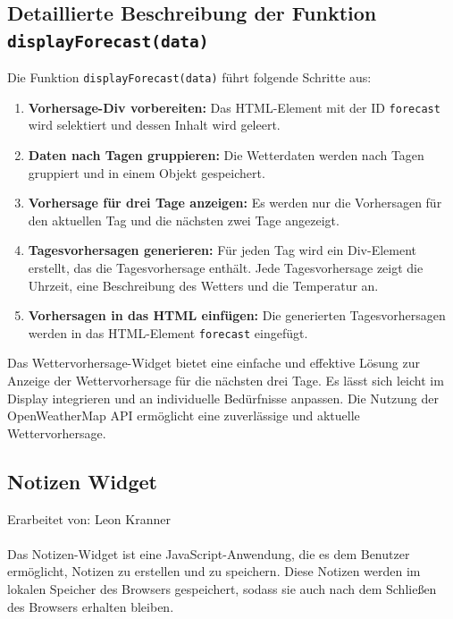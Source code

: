 \subsection*{Detaillierte Beschreibung der Funktion \texttt{displayForecast(data)}}
Die Funktion \texttt{displayForecast(data)} führt folgende Schritte aus:

\begin{enumerate}
    \item \textbf{Vorhersage-Div vorbereiten:}
    Das HTML-Element mit der ID \texttt{forecast} wird selektiert und dessen Inhalt wird geleert.
    
    \item \textbf{Daten nach Tagen gruppieren:}
    Die Wetterdaten werden nach Tagen gruppiert und in einem Objekt gespeichert.
    
    \item \textbf{Vorhersage für drei Tage anzeigen:}
    Es werden nur die Vorhersagen für den aktuellen Tag und die nächsten zwei Tage angezeigt.
    
    \item \textbf{Tagesvorhersagen generieren:}
    Für jeden Tag wird ein Div-Element erstellt, das die Tagesvorhersage enthält. Jede Tagesvorhersage zeigt die Uhrzeit, eine Beschreibung des Wetters und die Temperatur an.
    
    \item \textbf{Vorhersagen in das HTML einfügen:}
    Die generierten Tagesvorhersagen werden in das HTML-Element \texttt{forecast} eingefügt.
\end{enumerate}


\noindent
Das Wettervorhersage-Widget bietet eine einfache und effektive Lösung zur Anzeige der Wettervorhersage für die nächsten drei Tage. Es lässt sich leicht im Display integrieren und an individuelle Bedürfnisse anpassen. Die Nutzung der OpenWeatherMap API ermöglicht eine zuverlässige und aktuelle Wettervorhersage.


\subsection{Notizen Widget}
Erarbeitet von: Leon Kranner \\ \\

\noindent
Das Notizen-Widget ist eine JavaScript-Anwendung, die es dem Benutzer ermöglicht, Notizen zu erstellen und zu speichern. Diese Notizen werden im lokalen Speicher des Browsers gespeichert, sodass sie auch nach dem Schließen des Browsers erhalten bleiben.

